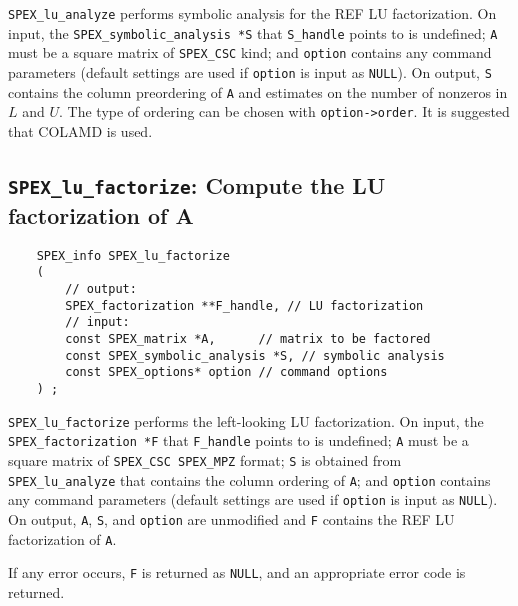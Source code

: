 \documentclass[12pt]{report}
\theoremstyle{definition}
\begin{document}
\verb|SPEX_lu_analyze| performs symbolic analysis for the REF LU factorization. On input, the \verb|SPEX_symbolic_analysis *S| that \verb|S_handle| points to is undefined; \verb|A| must be a square matrix of \verb|SPEX_CSC| kind; and \verb|option| contains any command parameters  (default settings are used if
\verb|option| is input as \verb|NULL|). On output, \verb|S| contains the column preordering of \verb|A| and estimates on the number of nonzeros in $L$ and $U$. The type of ordering can be chosen with \verb|option->order|. It is suggested that COLAMD is used.


\subsection{\texttt{SPEX\_lu\_factorize}: Compute the LU factorization of A} \label{ss:spex_left_lu_factorize}

\begin{mdframed}[userdefinedwidth=6in]
{\footnotesize
\begin{verbatim}
    SPEX_info SPEX_lu_factorize
    (
        // output:
        SPEX_factorization **F_handle, // LU factorization
        // input:
        const SPEX_matrix *A,      // matrix to be factored
        const SPEX_symbolic_analysis *S, // symbolic analysis
        const SPEX_options* option // command options
    ) ;
\end{verbatim}
} \end{mdframed}

\verb|SPEX_lu_factorize| performs the left-looking LU factorization. On input, the \verb|SPEX_factorization *F| that \verb|F_handle| points to is undefined; \verb|A| must be a square matrix of \verb|SPEX_CSC SPEX_MPZ| format; \verb|S| is obtained from \verb|SPEX_lu_analyze| that contains the column ordering of \verb|A|; and \verb|option| contains any command parameters (default settings are used if
\verb|option| is input as \verb|NULL|). On output, \verb|A|, \verb|S|, and \verb|option| are unmodified and \verb|F|  contains the REF LU factorization of \verb|A|.

If any error occurs, \verb|F| is returned as \verb|NULL|, and an appropriate error code is returned.
\end{document}
